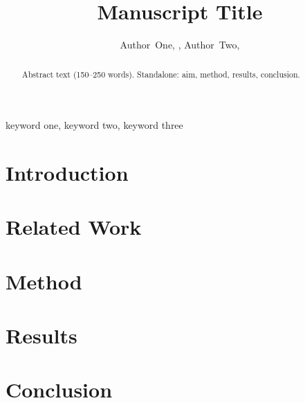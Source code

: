 \documentclass[journal]{IEEEtran}
\begin{document}
\title{Manuscript Title}
\author{Author~One, ,
        Author~Two, }
\maketitle

\begin{abstract}
Abstract text (150--250 words). Standalone: aim, method, results, conclusion.
\end{abstract}

\begin{IEEEkeywords}
keyword one, keyword two, keyword three
\end{IEEEkeywords}

\section{Introduction}

\section{Related Work}

\section{Method}

\section{Results}

\section{Conclusion}



\end{document}
